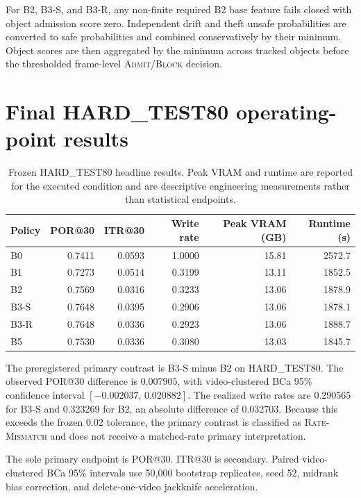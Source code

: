 \documentclass[10pt,twocolumn,letterpaper]{article}
\begin{document}
For B2, B3-S, and B3-R, any non-finite required B2 base feature fails closed
with object admission score zero.  Independent drift and theft unsafe
probabilities are converted to safe probabilities and combined
conservatively by their minimum.  Object scores are then aggregated by the
minimum across tracked objects before the thresholded frame-level
\textsc{Admit}/\textsc{Block} decision.

\section{Final HARD\_TEST80 operating-point results}
\label{sec:supp-hard}

\begin{table}[t]
\centering
\small
\caption{Frozen HARD\_TEST80 headline results.  Peak VRAM and runtime are
reported for the executed condition and are descriptive engineering
measurements rather than statistical endpoints.}
\label{tab:supp-hard}
\begin{tabular}{lrrrrr}
\toprule
Policy & POR@30 & ITR@30 & Write rate & Peak VRAM (GB) & Runtime (s) \\
\midrule
B0   & 0.7411 & 0.0593 & 1.0000 & 15.81 & 2572.7 \\
B1   & 0.7273 & 0.0514 & 0.3199 & 13.11 & 1852.5 \\
B2   & 0.7569 & 0.0316 & 0.3233 & 13.06 & 1878.9 \\
B3-S & 0.7648 & 0.0395 & 0.2906 & 13.06 & 1878.1 \\
B3-R & 0.7648 & 0.0336 & 0.2923 & 13.06 & 1888.7 \\
B5   & 0.7530 & 0.0336 & 0.3080 & 13.03 & 1845.7 \\
\bottomrule
\end{tabular}
\end{table}

The preregistered primary contrast is B3-S minus B2 on HARD\_TEST80.  The
observed POR@30 difference is $0.007905$, with video-clustered BCa 95\%
confidence interval $[-0.002037,\,0.020882]$.  The realized write rates are
0.290565 for B3-S and 0.323269 for B2, an absolute difference of 0.032703.
Because this exceeds the frozen 0.02 tolerance, the primary contrast is
classified as \textsc{Rate-Mismatch} and does not receive a matched-rate
primary interpretation.

The sole primary endpoint is POR@30.  ITR@30 is secondary.  Paired
video-clustered BCa 95\% intervals use 50,000 bootstrap replicates, seed 52,
midrank bias correction, and delete-one-video jackknife acceleration.
\end{document}

